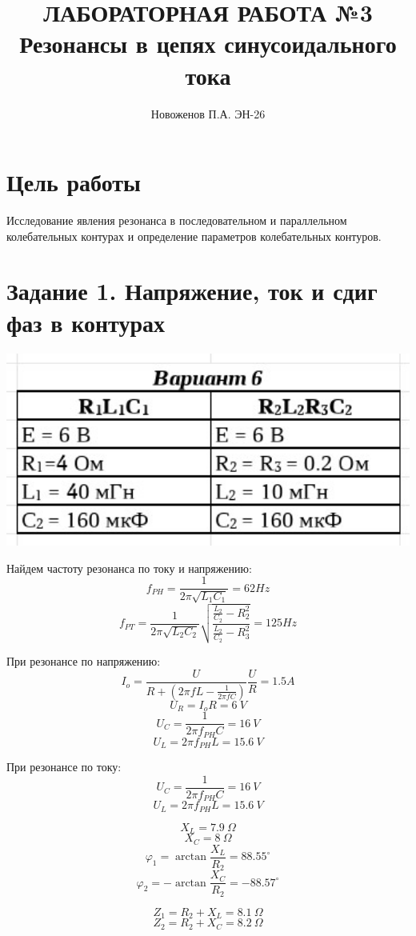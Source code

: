 \documentclass[14pt, a4paper]{article}
\title{ЛАБОРАТОРНАЯ РАБОТА №3 Резонансы в цепях синусоидального тока
}
\author{Новоженов П.А. ЭН-26}
\date{}
\begin{document}
    \maketitle
    \thispagestyle{empty}
    \clearpage
    
    \section*{Цель работы}
        Исследование явления резонанса в последовательном и параллельном
        колебательных контурах и определение параметров колебательных контуров.

    \section*{Задание 1. Напряжение, ток и сдиг фаз в контурах}

    {\includegraphics[width=1.2\textwidth]{table1.jpg}}

        Найдем частоту резонанса по току и напряжению:
        $$f_{PH} = \frac{1}{2\pi\sqrt{L_1C_1}} = 62 Hz $$ 
        $$f_{PT} = \frac{1}{2\pi\sqrt{L_2C_2}}\sqrt{\frac{\frac{L_2}{C_2} - R_2^2}{\frac{L_2}{C_2} - R_3^2}} = 125 Hz$$

        При резонансе по напряжению:
        $$I_o = \frac{U}{R+(2\pi f L - \frac{1}{2\pi f C})} \frac{U}{R} = 1.5 A$$
        $$ $$
        $$U_R = I_o R = 6\ V$$
        $$U_C = \frac{1}{2\pi f_{PH} C} = 16 \ V$$
        $$U_L =2\pi f_{PH} L = 15.6 \ V $$

        При резонансе по току:
        $$U_C = \frac{1}{2\pi f_{PH} C} = 16 \ V$$
        $$U_L =2\pi f_{PH} L = 15.6 \ V $$

        $$X_L = 7.9 \ \Omega$$
        $$X_C = 8 \ \Omega$$
        $$\varphi_1 = \arctan\frac{X_L}{R_2} = 88.55^\circ$$
        $$\varphi_2 = -\arctan\frac{X_C}{R_2} = -88.57^\circ$$

        $$Z_1 = R_2 + X_L = 8.1 \ \Omega$$
        $$Z_2 = R_2 + X_C = 8.2 \ \Omega$$
\end{document}
